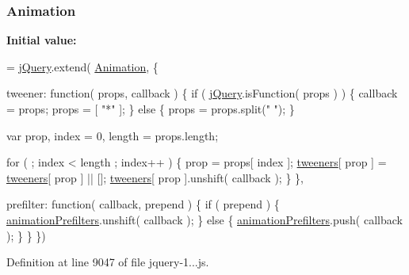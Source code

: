 \subsubsection[{Animation}]{ Animation}\label{_scripts_2jquery-1_810_82_8js_a3299b781c8ec8287357326920ab3565a}
{\bfseries Initial value\+:}
\begin{DoxyCode}
= \hyperlink{obj_2_release_2_package_2_package_tmp_2_scripts_2jquery-1_810_82_8js_a41c2e1bff4a6b292938143764e31d789}{jQuery}.extend( \hyperlink{obj_2_release_2_package_2_package_tmp_2_scripts_2jquery-1_810_82_8js_a3299b781c8ec8287357326920ab3565a}{Animation}, \{

    tweener: \textcolor{keyword}{function}( props, callback ) \{
        \textcolor{keywordflow}{if} ( \hyperlink{obj_2_release_2_package_2_package_tmp_2_scripts_2jquery-1_810_82_8js_a41c2e1bff4a6b292938143764e31d789}{jQuery}.isFunction( props ) ) \{
            callback = props;
            props = [ \textcolor{stringliteral}{"*"} ];
        \} \textcolor{keywordflow}{else} \{
            props = props.split(\textcolor{stringliteral}{" "});
        \}

        var prop,
            index = 0,
            length = props.length;

        \textcolor{keywordflow}{for} ( ; index < length ; index++ ) \{
            prop = props[ index ];
            \hyperlink{obj_2_release_2_package_2_package_tmp_2_scripts_2jquery-1_810_82_8js_a948afd2431eec272c99689edddfb6850}{tweeners}[ prop ] = \hyperlink{obj_2_release_2_package_2_package_tmp_2_scripts_2jquery-1_810_82_8js_a948afd2431eec272c99689edddfb6850}{tweeners}[ prop ] || [];
            \hyperlink{obj_2_release_2_package_2_package_tmp_2_scripts_2jquery-1_810_82_8js_a948afd2431eec272c99689edddfb6850}{tweeners}[ prop ].unshift( callback );
        \}
    \},

    prefilter: \textcolor{keyword}{function}( callback, prepend ) \{
        \textcolor{keywordflow}{if} ( prepend ) \{
            \hyperlink{obj_2_release_2_package_2_package_tmp_2_scripts_2jquery-1_810_82_8js_adb3f17c5359fbc12b7043b6969553d78}{animationPrefilters}.unshift( callback );
        \} \textcolor{keywordflow}{else} \{
            \hyperlink{obj_2_release_2_package_2_package_tmp_2_scripts_2jquery-1_810_82_8js_adb3f17c5359fbc12b7043b6969553d78}{animationPrefilters}.push( callback );
        \}
    \}
\})
\end{DoxyCode}


Definition at line 9047 of file jquery-\/1...\+js.

